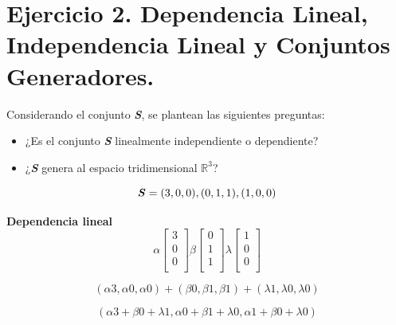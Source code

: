 
\section{\large Ejercicio 2. Dependencia Lineal, Independencia Lineal y Conjuntos Generadores.}

Considerando el conjunto \textbf{\textit{S}}, se plantean las siguientes preguntas:
\begin{itemize}
    \item ¿Es el conjunto \textbf{\textit{S}} linealmente independiente o dependiente?
    \item ¿\textbf{\textit{S}} genera al espacio tridimensional $\mathbb{R}^3$?
\end{itemize}

\[
    \text{\textbf{\textit{S}}}={(3,0,0),(0,1,1),(1,0,0)}
\]

\textbf{Dependencia lineal}
\[
    \alpha\begin{bmatrix}
        3 \\
        0 \\
        0 \\
    \end{bmatrix}
    \beta\begin{bmatrix}
        0 \\
        1 \\
        1 \\
    \end{bmatrix}
    \lambda\begin{bmatrix}
        1 \\
        0 \\
        0 \\
    \end{bmatrix}
\]

\[
    (\alpha3,\alpha0,\alpha0)+(\beta0,\beta1,\beta1)+(\lambda1,\lambda0,\lambda0)
\]


\[
    (\alpha3+\beta0+\lambda1,\alpha0+\beta1+\lambda0,\alpha1+\beta0+\lambda0)
\]

